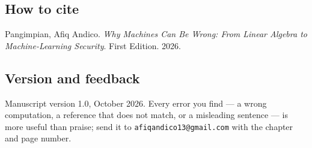 \subsection*{How to cite}
Pangimpian, Afiq Andico. \emph{Why Machines Can Be Wrong: From Linear Algebra to
Machine-Learning Security}. First Edition. 2026.

\subsection*{Version and feedback}
Manuscript version 1.0, October 2026. Every error you find --- a wrong computation, a
reference that does not match, or a misleading sentence --- is more useful than praise;
send it to \texttt{afiqandico13@gmail.com} with the chapter and page number.
